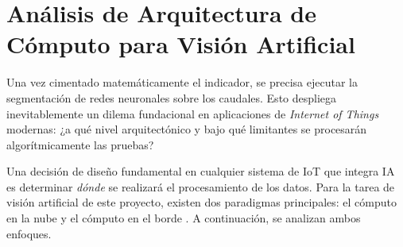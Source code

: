 \section{Análisis de Arquitectura de Cómputo para Visión Artificial}
\label{sec:analisis_edge_vs_cloud}
Una vez cimentado matemáticamente el indicador, se precisa ejecutar la segmentación de redes neuronales sobre los caudales. Esto despliega inevitablemente un dilema fundacional en aplicaciones de \textit{Internet of Things} modernas: ¿a qué nivel arquitectónico y bajo qué limitantes se procesarán algorítmicamente las pruebas?



Una decisión de diseño fundamental en cualquier sistema de IoT que integra IA es determinar \textit{dónde} se realizará el procesamiento de los datos. Para la tarea de visión artificial de este proyecto, existen dos paradigmas principales: el cómputo en la nube y el cómputo en el borde \cite{shi2016edge}. A continuación, se analizan ambos enfoques.

